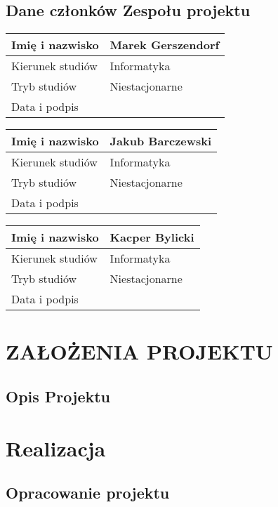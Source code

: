 \documentclass[12pt, oneside, a4paper]{book}
\begin{document}
\section{Dane członków Zespołu projektu}

\begin{tabular}{ |p{5cm}|p{7cm}|}
    \hline
    Imię i nazwisko & Marek Gerszendorf \\
    \hline
    Kierunek studiów & Informatyka\\
    \hline
    Tryb studiów & Niestacjonarne\\
    \hline
    Data i podpis & \\ \hline
\end{tabular}

\begin{tabular}{ |p{5cm}|p{7cm}|}
    \hline
    Imię i nazwisko & Jakub Barczewski\\
    \hline
    Kierunek studiów & Informatyka\\
    \hline
    Tryb studiów & Niestacjonarne\\
    \hline
    Data i podpis & \\ \hline
\end{tabular}

\begin{tabular}{ |p{5cm}|p{7cm}|}
    \hline
    Imię i nazwisko & Kacper Bylicki\\
    \hline
    Kierunek studiów & Informatyka\\
    \hline
    Tryb studiów & Niestacjonarne\\
    \hline
    Data i podpis & \\ \hline
\end{tabular}

\chapter{\MakeUppercase{Założenia projektu}}

\section{Opis Projektu}

\chapter{Realizacja}

\section{Opracowanie projektu}
\end{document}
